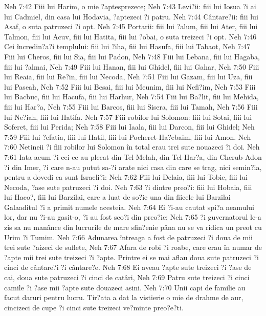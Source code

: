 Neh 7:42  Fiii lui Harim, o mie ?aptesprezece;
Neh 7:43  Levi?ii: fiii lui Iosua ?i ai lui Cadmiel, din casa lui Hodavia, ?aptezeci ?i patru.
Neh 7:44  Cântare?ii: fiii lui Asaf, o suta patruzeci ?i opt.
Neh 7:45  Portarii: fiii lui ?alum, fiii lui Ater, fiii lui Talmon, fiii lui Acuv, fiii lui Hatita, fiii lui ?obai, o suta treizeci ?i opt.
Neh 7:46  Cei încredin?a?i templului: fiii lui ?iha, fiii lui Hasufa, fiii lui Tabaot,
Neh 7:47  Fiii lui Cheros, fiii lui Sia, fiii lui Padon,
Neh 7:48  Fiii lui Lebana, fiii lui Hagaba, fiii lui ?almai,
Neh 7:49  Fiii lui Hanan, fiii lui Ghidel, fiii lui Gahar,
Neh 7:50  Fiii lui Reaia, fiii lui Re?in, fiii lui Necoda,
Neh 7:51  Fiii lui Gazam, fiii lui Uza, fiii lui Paseah,
Neh 7:52  Fiii lui Besai, fiii lui Meunim, fiii lui Nefi?im,
Neh 7:53  Fiii lui Bacbuc, fiii lui Hacufa, fiii lui Harhur,
Neh 7:54  Fiii lui Ba?lit, fiii lui Mehida, fiii lui Har?a,
Neh 7:55  Fiii lui Barcos, fiii lui Sisera, fiii lui Tamah,
Neh 7:56  Fiii lui Ne?iah, fiii lui Hatifa.
Neh 7:57  Fiii robilor lui Solomon: fiii lui Sotai, fiii lui Soferet, fiii lui Perida;
Neh 7:58  Fiii lui Iaala, fiii lui Darcon, fiii lui Ghidel;
Neh 7:59  Fiii lui ?efatia, fiii lui Hatil, fiii lui Pocheret-Ha?ebaim, fiii lui Amon.
Neh 7:60  Netineii ?i fiii robilor lui Solomon în total erau trei sute nouazeci ?i doi.
Neh 7:61  Iata acum ?i cei ce au plecat din Tel-Melah, din Tel-Har?a, din Cherub-Adon ?i din Imer, ?i care n-au putut sa-?i arate nici casa din care se trag, nici semin?ia, pentru a dovedi ca sunt Israeli?i:
Neh 7:62  Fiii lui Delaia, fiii lui Tobie, fiii lui Necoda, ?ase sute patruzeci ?i doi.
Neh 7:63  ?i dintre preo?i: fiii lui Hobaia, fiii lui Haco?, fiii lui Barzilai, care a luat de so?ie una din fiicele lui Barzilai Galaaditul ?i a primit numele acesteia.
Neh 7:64  Ei ?i-au cautat spi?a neamului lor, dar nu ?i-au gasit-o, ?i au fost sco?i din preo?ie;
Neh 7:65  ?i guvernatorul le-a zis sa nu manânce din lucrurile de mare sfin?enie pâna nu se va ridica un preot cu Urim ?i Tumim.
Neh 7:66  Adunarea întreaga a fost de patruzeci ?i doua de mii trei sute ?aizeci de suflete,
Neh 7:67  Afara de robi ?i roabe, care erau în numar de ?apte mii trei sute treizeci ?i ?apte. Printre ei se mai aflau doua sute patruzeci ?i cinci de cântare?i ?i cântare?e.
Neh 7:68  Ei aveau ?apte sute treizeci ?i ?ase de cai, doua sute patruzeci ?i cinci de catâri,
Neh 7:69  Patru sute treizeci ?i cinci camile ?i ?ase mii ?apte sute douazeci asini.
Neh 7:70  Unii capi de familie au facut daruri pentru lucru. Tir?ata a dat la vistierie o mie de drahme de aur, cincizeci de cupe ?i cinci sute treizeci ve?minte preo?e?ti.
